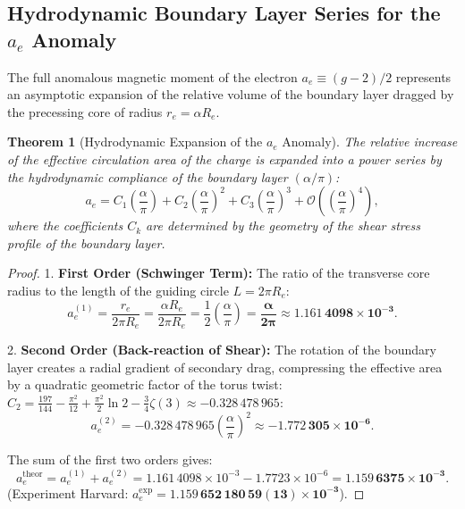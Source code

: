 \documentclass[12pt,a4paper]{article}
\newtheorem{theorem}{Theorem}
\begin{document}
	\subsection{Hydrodynamic Boundary Layer Series for the $a_e$ Anomaly}
	The full anomalous magnetic moment of the electron $a_e \equiv (g-2)/2$ represents an asymptotic expansion of the relative volume of the boundary layer dragged by the precessing core of radius $r_e = \alpha R_e$.
				
	\begin{theorem}[Hydrodynamic Expansion of the $a_e$ Anomaly]
	The relative increase of the effective circulation area of the charge is expanded into a power series by the hydrodynamic compliance of the boundary layer $(\alpha/\pi)$:
	\begin{equation}
	a_e = C_1 \left(\frac{\alpha}{\pi}\right) + C_2 \left(\frac{\alpha}{\pi}\right)^2 + C_3 \left(\frac{\alpha}{\pi}\right)^3 + \mathcal{O}\left( \left(\frac{\alpha}{\pi}\right)^4 \right),
	\end{equation}
	where the coefficients $C_k$ are determined by the geometry of the shear stress profile of the boundary layer.
	\end{theorem}
				
	\begin{proof}
	1. \textbf{First Order (Schwinger Term):} The ratio of the transverse core radius to the length of the guiding circle $L = 2\pi R_e$:
	\begin{equation}
	a_e^{(1)} = \frac{r_e}{2\pi R_e} = \frac{\alpha R_e}{2\pi R_e} = \frac{1}{2} \left(\frac{\alpha}{\pi}\right) = \mathbf{\frac{\alpha}{2\pi}} \approx \mathbf{1.161\,4098 \times 10^{-3}}.
	\end{equation}
					
	2. \textbf{Second Order (Back-reaction of Shear):} The rotation of the boundary layer creates a radial gradient of secondary drag, compressing the effective area by a quadratic geometric factor of the torus twist: $C_2 = \frac{197}{144} - \frac{\pi^2}{12} + \frac{\pi^2}{2}\ln 2 - \frac{3}{4}\zeta(3) \approx -0.328\,478\,965$:
	\begin{equation}
	a_e^{(2)} = -0.328\,478\,965 \left(\frac{\alpha}{\pi}\right)^2 \approx \mathbf{-1.772\,305 \times 10^{-6}}.
	\end{equation}
					
	The sum of the first two orders gives:
	\begin{equation}
	a_e^{\text{theor}} = a_e^{(1)} + a_e^{(2)} = 1.161\,4098 \times 10^{-3} - 1.7723 \times 10^{-6} = \mathbf{1.159\,6375 \times 10^{-3}}.
	\end{equation}
	(Experiment Harvard: $a_e^{\text{exp}} = \mathbf{1.159\,652\,180\,59(13) \times 10^{-3}}$).
	\end{proof}
				
\end{document}
